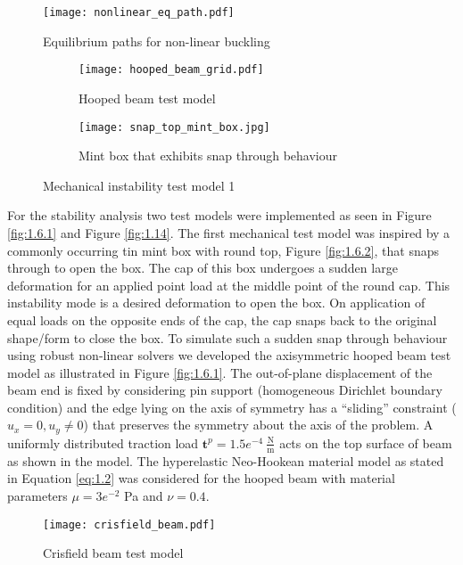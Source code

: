 \begin{figure}[h]
\centering 
\texttt{[image: nonlinear\_eq\_path.pdf]}
\caption{Equilibrium paths for non-linear buckling}
\label{fig:1.8}
\end{figure}

\begin{figure}[ht!]
\centering
\begin{subfigure}[b]{0.7\textwidth}
\centering
\texttt{[image: hooped\_beam\_grid.pdf]}
\caption{Hooped beam test model}
\label{fig:1.6.1}
\end{subfigure}
\begin{subfigure}[b]{0.29\textwidth}
\centering
\texttt{[image: snap\_top\_mint\_box.jpg]}
\caption{Mint box that exhibits snap through behaviour}
\label{fig:1.6.2}
\end{subfigure}
\caption{Mechanical instability test model 1}
\label{fig:1.6}
\end{figure}

For the stability analysis two test models were implemented as seen in Figure \eqref{fig:1.6.1} and Figure \eqref{fig:1.14}. The first mechanical test model was inspired by a commonly occurring tin mint box with round top, Figure \eqref{fig:1.6.2}, that snaps through to open the box. The cap of this box undergoes a sudden large deformation for an applied point load at the middle point of the round cap. This instability mode is a desired deformation to open the box. On application of equal loads on the opposite ends of the cap, the cap snaps back to the original shape/form to close the box. To simulate such a sudden snap through behaviour using robust non-linear solvers we developed the axisymmetric hooped beam test model as illustrated in Figure \eqref{fig:1.6.1}. The out-of-plane displacement of the beam end is fixed by considering pin support (homogeneous Dirichlet boundary condition) and the edge lying on the axis of symmetry has a ``sliding'' constraint ($u_x = 0, u_y \neq 0$) that preserves the symmetry about the axis of the problem. A uniformly distributed traction load $\mathbf{t}^p = 1.5e^{-4} \ \frac{\text{N}}{\text{m}}$ acts on the top surface of beam as shown in the model. The hyperelastic Neo-Hookean material model as stated in Equation \eqref{eq:1.2} was considered for the hooped beam with material parameters $\mu = 3e^{-2}$ Pa and $\nu = 0.4$.\par 

\begin{figure}[ht!]
\centering
\texttt{[image: crisfield\_beam.pdf]}
\caption{Crisfield beam test model}
\label{fig:1.14}
\end{figure}

